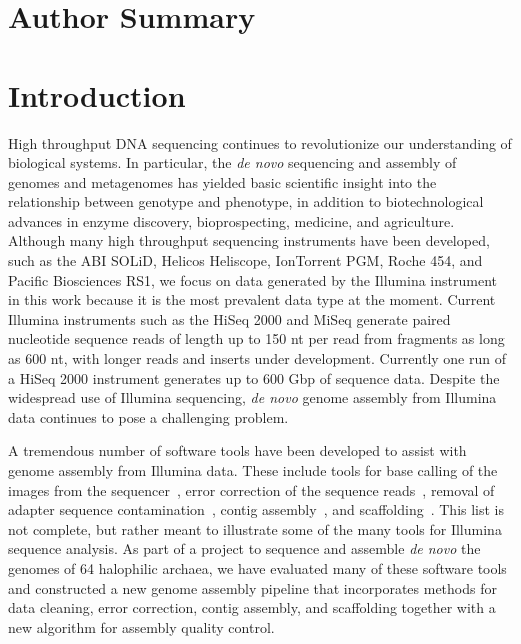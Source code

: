 \documentclass[10pt]{article}
\begin{document}
\section*{Author Summary}

\section*{Introduction}
High throughput DNA sequencing continues to revolutionize our understanding of biological systems. In particular,
the \textit{de novo} sequencing and assembly of genomes and metagenomes has yielded basic scientific insight into 
the relationship between genotype and phenotype,
in addition to biotechnological advances in enzyme discovery, bioprospecting, medicine, and agriculture.  
Although many high throughput sequencing instruments have been developed, such as the ABI SOLiD, Helicos Heliscope, IonTorrent PGM, Roche 454, and 
Pacific Biosciences RS1, we focus on data generated by the Illumina instrument in this work because it is the most prevalent data type at the moment. 
Current Illumina instruments such as the HiSeq 2000 and MiSeq generate paired nucleotide sequence reads of length up to 150 nt per read from fragments  
as long as 600 nt, with longer reads and inserts under development. Currently one run of a HiSeq 2000 instrument generates up to 600 Gbp of sequence data.  Despite the widespread use of Illumina  
sequencing, \emph{de novo} genome assembly from Illumina data continues to pose a challenging problem.

A tremendous number of software tools have been developed to assist with genome assembly from Illumina data.
These include tools for base calling of the images from the sequencer~\cite{BayesCall,Kircher2009},
error correction of the sequence reads~\cite{Kelley2010,Kao2011}, removal of adapter sequence contamination~\cite{Lassmann2009},
contig assembly~\cite{Warren2007,Chaisson2008}, and scaffolding~\cite{Koren2011,Boetzer2011,Dayarian2010}.
This list is not complete, but rather meant to illustrate some of the many tools for Illumina sequence analysis.
As part of a project to sequence and assemble \textit{de novo} the genomes of 64 halophilic archaea, we have
evaluated many of these software tools and constructed a new genome assembly pipeline that incorporates
methods for data cleaning, error correction, contig assembly, and scaffolding together with a new algorithm
for assembly quality control. 
\end{document}
